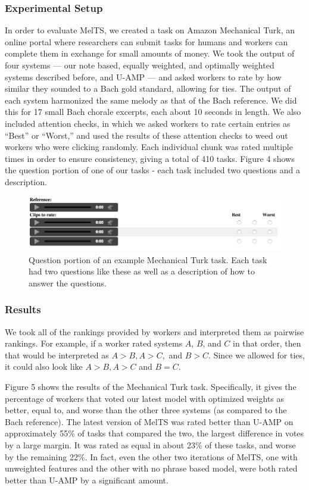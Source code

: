 \documentclass{sig-alternate}
\begin{document}
\subsubsection{Experimental Setup}
In order to evaluate MelTS, we created a task on Amazon Mechanical Turk, an online portal where researchers can submit tasks for humans and workers can complete them in exchange for small amounts of money. We took the output of four systems --- our note based, equally weighted, and optimally weighted systems described before, and U-AMP \cite{UAMP} --- and asked workers to rate by how similar they sounded to a Bach gold standard, allowing for ties. The output of each system harmonized the same melody as that of the Bach reference. We did this for 17 small Bach chorale excerpts, each about 10 seconds in length. We also included attention checks, in which we asked workers to rate certain entries as ``Best'' or ``Worst,'' and used the results of these attention checks to weed out workers who were clicking randomly. Each individual chunk was rated multiple times in order to ensure consistency, giving a total of 410 tasks. Figure 4 shows the question portion of one of our tasks - each task included two questions and a description.

\begin{figure}
\includegraphics[scale=0.3]{mturk_task}
\caption{Question portion of an example Mechanical Turk task. Each task had two questions like these as well as a description of how to answer the questions.}
\end{figure}

\subsubsection{Results}
We took all of the rankings provided by workers and interpreted them as pairwise rankings. For example, if a worker rated systems $A$, $B$, and $C$ in that order, then that would be interpreted as $A>B, A>C,$ and $B>C$. Since we allowed for ties, it could also look like $A>B, A>C$ and $B=C$. 

Figure 5 shows the results of the Mechanical Turk task. Specifically, it gives the percentage of workers that voted our latest model with optimized weights as better, equal to, and worse than the other three systems (as compared to the Bach reference). The latest version of MelTS was rated better than U-AMP on approximately 55\% of tasks that compared the two, the largest difference in votes by a large margin. It was rated as equal in about 23\% of these tasks, and worse by the remaining 22\%. In fact, even the other two iterations of MelTS, one with unweighted features and the other with no phrase based model, were both rated better than U-AMP by a significant amount.
\end{document}
